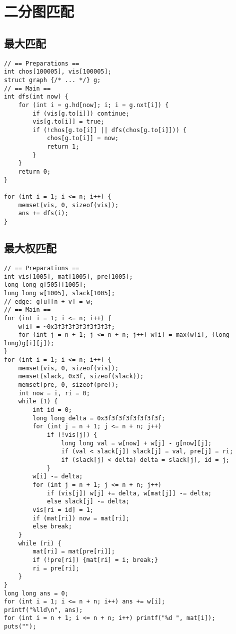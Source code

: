 \section{二分图匹配}

\subsection{最大匹配}

\begin{verbatim}
// == Preparations ==
int chos[100005], vis[100005];
struct graph {/* ... */} g;
// == Main ==
int dfs(int now) {
    for (int i = g.hd[now]; i; i = g.nxt[i]) {
        if (vis[g.to[i]]) continue;
        vis[g.to[i]] = true;
        if (!chos[g.to[i]] || dfs(chos[g.to[i]])) {
            chos[g.to[i]] = now;
            return 1;
        }
    }
    return 0;
}

for (int i = 1; i <= n; i++) {
    memset(vis, 0, sizeof(vis));
    ans += dfs(i);
}
\end{verbatim}

\subsection{最大权匹配}

\begin{verbatim}
// == Preparations ==
int vis[1005], mat[1005], pre[1005];
long long g[505][1005];
long long w[1005], slack[1005];
// edge: g[u][n + v] = w;
// == Main ==
for (int i = 1; i <= n; i++) {
    w[i] = ~0x3f3f3f3f3f3f3f3f;
    for (int j = n + 1; j <= n + n; j++) w[i] = max(w[i], (long long)g[i][j]);
}
for (int i = 1; i <= n; i++) {
    memset(vis, 0, sizeof(vis));
    memset(slack, 0x3f, sizeof(slack));
    memset(pre, 0, sizeof(pre));
    int now = i, ri = 0;
    while (1) {
        int id = 0;
        long long delta = 0x3f3f3f3f3f3f3f3f;
        for (int j = n + 1; j <= n + n; j++)
            if (!vis[j]) {
                long long val = w[now] + w[j] - g[now][j];
                if (val < slack[j]) slack[j] = val, pre[j] = ri;
                if (slack[j] < delta) delta = slack[j], id = j;
            }
        w[i] -= delta;
        for (int j = n + 1; j <= n + n; j++)
            if (vis[j]) w[j] += delta, w[mat[j]] -= delta;
            else slack[j] -= delta;
        vis[ri = id] = 1;
        if (mat[ri]) now = mat[ri];
        else break;
    }
    while (ri) {
        mat[ri] = mat[pre[ri]];
        if (!pre[ri]) {mat[ri] = i; break;}
        ri = pre[ri];
    }
}
long long ans = 0;
for (int i = 1; i <= n + n; i++) ans += w[i];
printf("%lld\n", ans);
for (int i = n + 1; i <= n + n; i++) printf("%d ", mat[i]);
puts("");
\end{verbatim}